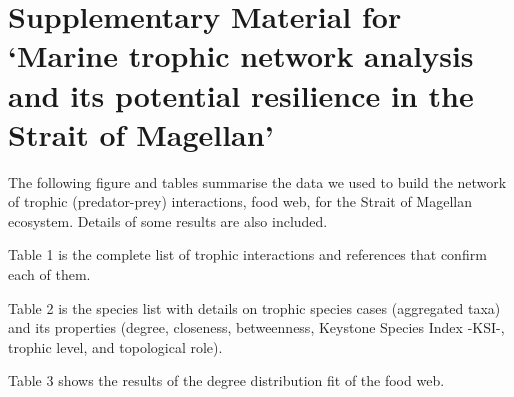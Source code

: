 \documentclass[
]{article}
\author{}
\date{\vspace{-2.5em}}
\begin{document}
\section{Supplementary Material for `Marine trophic network analysis and
its potential resilience in the Strait of
Magellan'}\label{supplementary-material-for-marine-trophic-network-analysis-and-its-potential-resilience-in-the-strait-of-magellan}

The following figure and tables summarise the data we used to build the
network of trophic (predator-prey) interactions, food web, for the
Strait of Magellan ecosystem. Details of some results are also included.

Table 1 is the complete list of trophic interactions and references that
confirm each of them.

Table 2 is the species list with details on trophic species cases
(aggregated taxa) and its properties (degree, closeness, betweenness,
Keystone Species Index -KSI-, trophic level, and topological role).

Table 3 shows the results of the degree distribution fit of the food
web.
\end{document}
